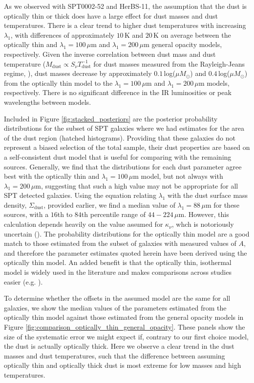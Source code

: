 As we observed with SPT0002-52 and HerBS-11, the assumption that the dust is optically thin or thick does have a large effect for dust masses and dust temperatures. There is a clear trend to higher dust temperatures with increasing $\lambda_1$, with differences of approximately $10\,$K and $20\,$K on average between the optically thin and $\lambda_1 = 100\,\mu$m and $\lambda_1 = 200\,\mu$m general opacity models, respectively. Given the inverse correlation between dust mass and dust temperature ($M_\textrm{dust} \propto S_\nu T_\textrm{dust}^{-1}$ for dust masses measured from the Rayleigh-Jeans regime, \citealt{Casey_2014b}), dust masses decrease by approximately $0.1\,$log($\mu M_\odot$) and $0.4\,$log($\mu M_\odot$) from the optically thin model to the $\lambda_1 = 100\,\mu$m and $\lambda_1 = 200\,\mu$m models, respectively. There is no significant difference in the IR luminosities or peak wavelengths between models.

Included in Figure \ref{fig:stacked_posteriors} are the posterior probability distributions for the subset of SPT galaxies where we had estimates for the area of the dust region (hatched histograms). Providing that these galaxies do not represent a biased selection of the total sample, their dust properties are based on a self-consistent dust model that is useful for comparing with the remaining sources. Generally, we find that the distributions for each dust parameter agree best with the optically thin and $\lambda_1 = 100\,\mu$m model, but not always with $\lambda_1 = 200\,\mu$m, suggesting that such a high value may not be appropriate for all SPT detected galaxies. Using the equation relating $\lambda_1$ with the dust surface mass density, $\Sigma_\textrm{dust}$, provided earlier, we find a median value of $\lambda_1 = 88\,\mu$m for these sources, with a $16$th to $84$th percentile range of $44 - 224\,\mu$m. However, this calculation depends heavily on the value assumed for $\kappa_\nu$, whch is notoriously uncertain (\citealt{Clark_2016}). The probability distributions for the optically thin model are a good match to those estimated from the subset of galaxies with measured values of $A$, and therefore the parameter estimates quoted herein have been derived using the optically thin model. An added benefit is that the optically thin, isothermal model is widely used in the literature and makes comparisons across studies easier (e.g. \citealt{Magdis_2012, Simpson_2017, Lamperti_2019, Dudzeviciute_2020, Valentino_2020a, daCunha_2021}).

To determine whether the offsets in the assumed model are the same for all galaxies, we show the median values of the parameters estimated from the optically thin model against those estimated from the general opacity models in Figure \ref{fig:comparison_optically_thin_general_opacity}. These panels show the size of the systematic error we might expect if, contrary to our first choice model, the dust is actually optically thick. Here we observe a clear trend in the dust masses and dust temperatures, such that the difference between assuming optically thin and optically thick dust is most extreme for low masses and high temperatures.

